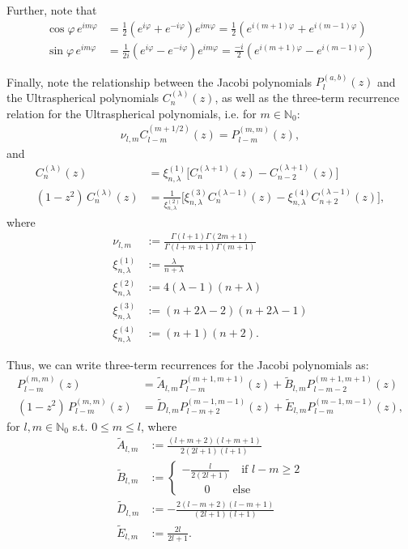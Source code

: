 \documentclass[11pt, oneside]{article}   	%
\newcommand{\No}{\mathbb{N}_0}
\newcommand{\cosphi}{\cos\varphi}
\newcommand{\sinphi}{\sin\varphi}
\newcommand{\eimphi}{e^{im\varphi}}
\newcommand{\Atilde}{\tilde{A}_{l,m}}
\newcommand{\Btilde}{\tilde{B}_{l,m}}
\newcommand{\Dtilde}{\tilde{D}_{l,m}}
\newcommand{\Etilde}{\tilde{E}_{l,m}}
\newcommand{\xione}{\xi^{(1)}_{n, \lambda}}
\newcommand{\xitwo}{\xi^{(2)}_{n, \lambda}}
\newcommand{\xithree}{\xi^{(3)}_{n, \lambda}}
\newcommand{\xifour}{\xi^{(4)}_{n, \lambda}}
\begin{document}
Further, note that
\begin{align}
\cosphi \, \eimphi &= \frac{1}{2} (e^{i\varphi} + e^{-i\varphi}) \eimphi =  \frac{1}{2} (e^{i(m+1)\varphi} + e^{i(m-1)\varphi}) \\
\sinphi \, \eimphi &= \frac{1}{2i} (e^{i\varphi} - e^{-i\varphi}) \eimphi =  \frac{-i}{2} (e^{i(m+1)\varphi} - e^{i(m-1)\varphi})
\end{align}

Finally, note the relationship between the Jacobi polynomials \(P^{(a,b)}_{l}(z)\) and the Ultraspherical polynomials \(C^{(\lambda)}_{n}(z)\), as well as the three-term recurrence relation for the Ultraspherical polynomials, i.e. for \(m \in \No\):
\begin{align}
\nu_{l,m} C^{(m+1/2)}_{l-m}(z) = P^{(m,m)}_{l-m}(z),
\end{align}
and
\begin{align}
C^{(\lambda)}_n(z) &= \xi^{(1)}_{n, \lambda} \big[ C^{(\lambda+1)}_n(z) - C^{(\lambda+1)}_{n-2}(z) \big]  \\
(1-z^2) \, C^{(\lambda)}_n(z) &= \frac{1}{\xi^{(2)}_{n, \lambda}} \big[ \xi^{(3)}_{n, \lambda} C^{(\lambda-1)}_n(z) - \xi^{(4)}_{n, \lambda}C^{(\lambda-1)}_{n+2}(z) \big] ,
\end{align}
where
\begin{align}
\nu_{l,m} &:= \frac{\Gamma(l+1)\Gamma(2m+1)}{\Gamma(l+m+1)\Gamma(m+1)} \\
\xione&:= \frac{\lambda}{n+\lambda} \\
\xitwo &:= 4(\lambda-1)(n+\lambda) \\
\xithree &:= (n+2\lambda-2)(n+2\lambda-1) \\
\xifour &:= (n+1)(n+2).
\end{align}

Thus, we can write three-term recurrences for the Jacobi polynomials as:
\begin{align}
P^{(m,m)}_{l-m}(z) &= \Atilde P^{(m+1,m+1)}_{l-m}(z) + \Btilde P^{(m+1,m+1)}_{l-m-2}(z) \\
(1-z^2) \, P^{(m,m)}_{l-m}(z) &= \Dtilde P^{(m-1,m-1)}_{l-m+2}(z) + \Etilde P^{(m-1,m-1)}_{l-m}(z),
\end{align}
for \(l, m \in \No\) s.t. \(0 \le m \le l\), where
\begin{align}
\Atilde &:= \frac{(l+m+2)(l+m+1)}{2(2l+1)(l+1)} \\
\Btilde &:= \begin{cases}
			- \frac{l}{2(2l+1)} \quad \text{if } l - m \ge 2 \\
			\quad \quad 0 \quad \quad \text{else}
		\end{cases} \\
\Dtilde &:= - \frac{2(l-m+2)(l-m+1)}{(2l+1)(l+1)} \\
\Etilde &:= \frac{2l}{2l+1} .
\end{align}
\end{document}
